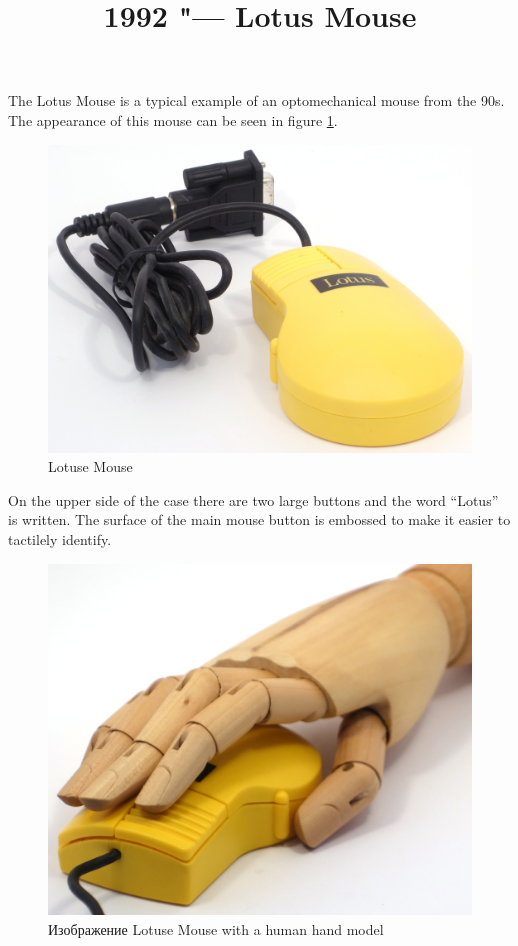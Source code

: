\documentclass[11pt, a4paper]{article}
\begin{document}
\title{1992 "--- Lotus Mouse}
\date{}
\maketitle

The Lotus Mouse is a typical example of an optomechanical mouse from the 90s. The appearance of this mouse can be seen in figure \ref{fig:LotusPic}.

\begin{figure}[h]
    \centering
    \includegraphics[scale=0.6]{1992_lotus_mouse/pic_30.jpg}
    \caption{Lotuse Mouse}
    \label{fig:LotusPic}
\end{figure}

On the upper side of the case there are two large buttons and the word “Lotus” is written. The surface of the main mouse button is embossed to make it easier to tactilely identify.

\begin{figure}[h]
    \centering
    \includegraphics[scale=0.3]{1992_lotus_mouse/hand_30.jpg}
    \caption{Изображение Lotuse Mouse with a human hand model}
    \label{fig:LotusHand}
\end{figure}
\end{document}
